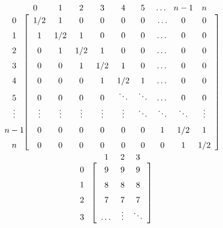 \documentclass{article}
\begin{document}
\newcommand{\Pf}{\mathbf{P}}
\newcommand{\UP}[2]{\makebox[0pt]{\smash{\raisebox{1.5em}{$\phantom{#2}#1$}}}#2}
\newcommand{\LF}[1]{\makebox[0pt]{$#1$\hspace{4.5em}}}

\[\renewcommand{\arraystretch}{1.5}
\left[
\begin{array}{c@{}c c c c c c c c c }
  \LF{0} & \UP{0} 1/2 & \UP{1} 1 & \UP{2} 0 & \UP{3} 0 & \UP{4} 0 & \UP{5} 0 & \UP{\dots} \dots & \UP{n-1}0 & \UP{n}0 \\
  \LF{1} & 1 & 1/2 & 1 & 0 & 0 & 0 & \dots & 0 & 0    \\ 
  \LF{2} & 0 & 1 & 1/2 & 1 & 0 & 0 & \dots & 0 & 0 \\ 
  \LF{3} & 0 & 0 & 1 & 1/2 & 1 & 0 & \dots & 0 & 0    \\
  \LF{4} & 0 & 0 & 0 & 1 & 1/2 & 1 & \dots & 0 & 0    \\
  \LF{5} & 0 & 0 & 0 & 0 & \ddots  & \ddots & \dots & 0 & 0    \\
  \LF{\vdots} & \vdots  & \vdots  & \vdots & \vdots & \vdots & \ddots & \ddots & \ddots  & \vdots    \\ 
  \LF{n-1} & 0 & 0 & 0 & 0 & 0 & 0 & 1 & 1/2 & 1 \\ 
  \LF{n} & 0 & 0 & 0 & 0 & 0 & 0 & 0 & 1 & 1/2  \\
\end{array}\right]
\]

\[\renewcommand{\arraystretch}{1.5}
\left[
\begin{array}{c@{}c c c }
\LF{0} & \UP{1} 9 & \UP{2} 9 & \UP{3} 9 \\
\LF{1} &  8 &  8 &  8 \\
\LF{2} &  7 &  7 &  7 \\
\LF{3} &  \dots & \vdots &  \ddots \\
\end{array}\right]
\]
\end{document}
